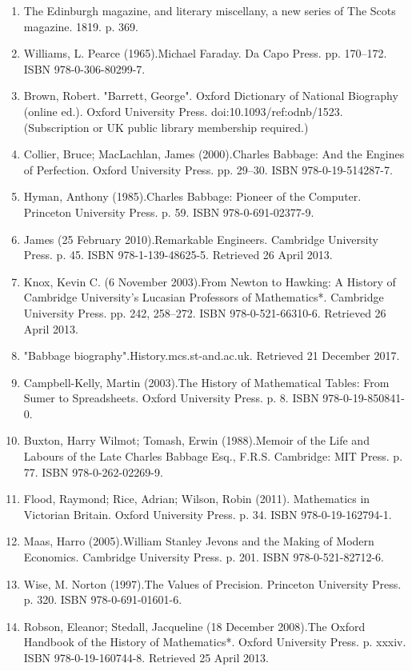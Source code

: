 \begin{enumerate}
\item The Edinburgh magazine, and literary miscellany, a new series of The Scots magazine. 1819. p. 369.
\item Williams, L. Pearce (1965).Michael Faraday. Da Capo Press. pp. 170–172. ISBN 978-0-306-80299-7.
\item Brown, Robert. "Barrett, George". Oxford Dictionary of National Biography (online ed.). Oxford University Press. doi:10.1093/ref:odnb/1523. (Subscription or UK public library membership required.)
\item Collier, Bruce; MacLachlan, James (2000).Charles Babbage: And the Engines of Perfection. Oxford University Press. pp. 29–30. ISBN 978-0-19-514287-7.
\item Hyman, Anthony (1985).Charles Babbage: Pioneer of the Computer. Princeton University Press. p. 59. ISBN 978-0-691-02377-9.
\item James (25 February 2010).Remarkable Engineers. Cambridge University Press. p. 45. ISBN 978-1-139-48625-5. Retrieved 26 April 2013.
\item Knox, Kevin C. (6 November 2003).From Newton to Hawking: A History of Cambridge University's Lucasian Professors of Mathematics*. Cambridge University Press. pp. 242, 258–272. ISBN 978-0-521-66310-6. Retrieved 26 April 2013.
\item "Babbage biography".History.mcs.st-and.ac.uk. Retrieved 21 December 2017.
\item Campbell-Kelly, Martin (2003).The History of Mathematical Tables: From Sumer to Spreadsheets. Oxford University Press. p. 8. ISBN 978-0-19-850841-0.
\item Buxton, Harry Wilmot; Tomash, Erwin (1988).Memoir of the Life and Labours of the Late Charles Babbage Esq., F.R.S. Cambridge: MIT Press. p. 77. ISBN 978-0-262-02269-9.
\item Flood, Raymond; Rice, Adrian; Wilson, Robin (2011). Mathematics in Victorian Britain. Oxford University Press. p. 34. ISBN 978-0-19-162794-1.
\item Maas, Harro (2005).William Stanley Jevons and the Making of Modern Economics. Cambridge University Press. p. 201. ISBN 978-0-521-82712-6.
\item Wise, M. Norton (1997).The Values of Precision. Princeton University Press. p. 320. ISBN 978-0-691-01601-6.
\item Robson, Eleanor; Stedall, Jacqueline (18 December 2008).The Oxford Handbook of the History of Mathematics*. Oxford University Press. p. xxxiv. ISBN 978-0-19-160744-8. Retrieved 25 April 2013.

\end{enumerate}
